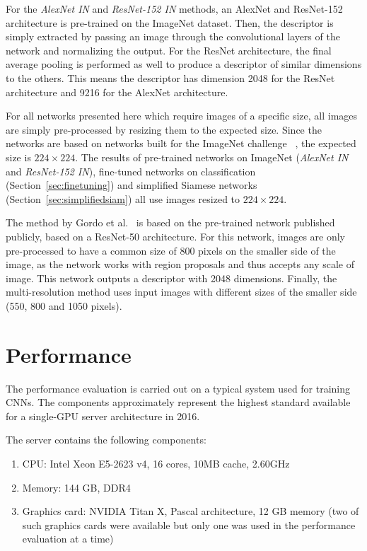 For the \emph{AlexNet IN} and \emph{ResNet-152 IN} methods,
an AlexNet and ResNet-152 architecture is pre-trained on the ImageNet dataset.
Then, the descriptor is simply extracted by passing an image through the
convolutional layers of the
network and normalizing the output. For the ResNet architecture, the final
average pooling is performed as well to produce a descriptor of similar
dimensions to the others. This means the descriptor has dimension 2048
for the ResNet architecture and 9216 for the AlexNet architecture.

For all networks presented here which require images of a specific size,
all images are simply pre-processed by resizing them to the expected
size. Since the networks are based on networks built for the ImageNet
challenge
~\cite{russakovsky_imagenet_2015,he_deep_2016,krizhevsky_imagenet_2012},
the expected size is $224 \times 224$. The results of pre-trained
networks on ImageNet (\emph{AlexNet IN} and \emph{ResNet-152 IN}),
fine-tuned networks on classification (Section~\ref{sec:finetuning}) and
simplified Siamese networks (Section~\ref{sec:simplifiedsiam}) all use
images resized to $224 \times 224$.

The method by Gordo et al.~\cite{gordo_deep_2016}
is based on the pre-trained network published publicly, based on a ResNet-50
architecture. For this network, images are only pre-processed to have a
common size of 800 pixels on the smaller side of the image,
as the network works with region proposals and thus accepts
any scale of image. This network outputs a descriptor with 2048 dimensions.
Finally, the multi-resolution method uses input images with different
sizes of the smaller side (550, 800 and 1050 pixels).

\section{Performance}
The performance evaluation is carried out on a typical system used for
training CNNs.
The components approximately represent the highest standard available for a
single-GPU server architecture in 2016.

The server contains the following components:
\begin{enumerate}
    \item CPU: Intel\textsuperscript{\textregistered} Xeon\textsuperscript{\textregistered}
    E5-2623 v4, 16 cores, 10MB cache, 2.60GHz
    \item Memory: 144 GB, DDR4 %
    \item Graphics card: NVIDIA\textsuperscript{\textregistered} Titan X, Pascal architecture,
    12 GB memory (two of such graphics cards were available but only one
    was used in the performance evaluation at a time)
\end{enumerate}

